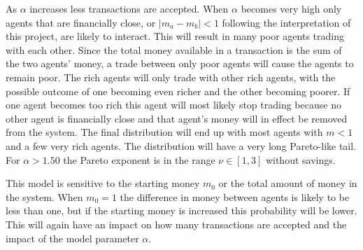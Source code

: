\documentclass{article}
\begin{document}
As $\alpha$ increases less transactions are accepted. When $\alpha$ becomes very high only agents that are financially close, or $|m_a - m_b| < 1$ following the interpretation of this project, are likely to interact. This will result in many poor agents trading with each other. Since the total money available in a transaction is the sum of the two agents' money, a trade between only poor agents will cause the agents to remain poor. The rich agents will only trade with other rich agents, with the possible outcome of one becoming even richer and the other becoming poorer. If one agent becomes too rich this agent will most likely stop trading because no other agent is financially close and that agent's money will in effect be removed from the system. The final distribution will end up with most agents with $m < 1$ and a few very rich agents. The distribution will have a very long Pareto-like tail. For $\alpha > 1.50$ the Pareto exponent is in the range $\nu \in [1,3]$ without savings. 

This model is sensitive to the starting money $m_0$ or the total amount of money in the system. When $m_0=1$ the difference in money between agents is likely to be less than one, but if the starting money is increased this probability will be lower. This will again have an impact on how many transactions are accepted and the impact of the model parameter $\alpha$.
\end{document}

